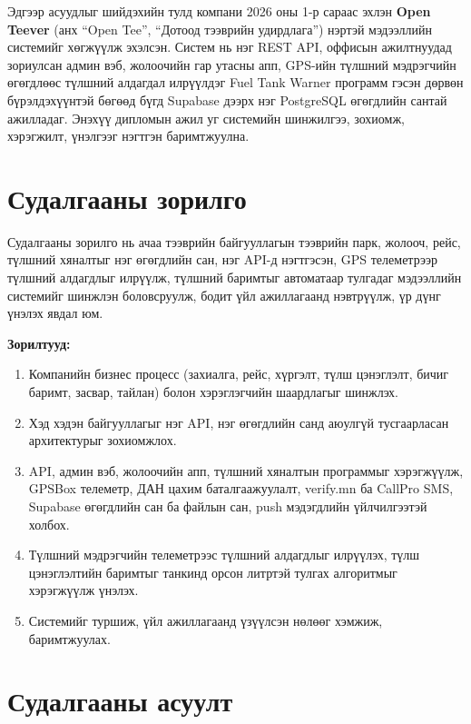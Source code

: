 \documentclass[
12pt,
oneside,
english,
onehalfspacing,
nolistspacing,
headsepline,
]{MUST-Thesis}
\begin{document}
Эдгээр асуудлыг шийдэхийн тулд компани 2026 оны 1-р сараас эхлэн \textbf{Open Teever} (анх ``Open Tee'', ``Дотоод тээврийн удирдлага'') нэртэй мэдээллийн системийг хөгжүүлж эхэлсэн. Систем нь нэг REST API, оффисын ажилтнуудад зориулсан админ вэб, жолоочийн гар утасны апп, GPS-ийн түлшний мэдрэгчийн өгөгдлөөс түлшний алдагдал илрүүлдэг Fuel Tank Warner программ гэсэн дөрвөн бүрэлдэхүүнтэй бөгөөд бүгд Supabase дээрх нэг PostgreSQL өгөгдлийн сантай ажилладаг. Энэхүү дипломын ажил уг системийн шинжилгээ, зохиомж, хэрэгжилт, үнэлгээг нэгтгэн баримтжуулна.

\section{Судалгааны зорилго}

Судалгааны зорилго нь ачаа тээврийн байгууллагын тээврийн парк, жолооч, рейс, түлшний хяналтыг нэг өгөгдлийн сан, нэг API-д нэгтгэсэн, GPS телеметрээр түлшний алдагдлыг илрүүлж, түлшний баримтыг автоматаар тулгадаг мэдээллийн системийг шинжлэн боловсруулж, бодит үйл ажиллагаанд нэвтрүүлж, үр дүнг үнэлэх явдал юм.

\textbf{Зорилтууд:}
\begin{enumerate}
    \item Компанийн бизнес процесс (захиалга, рейс, хүргэлт, түлш цэнэглэлт, бичиг баримт, засвар, тайлан) болон хэрэглэгчийн шаардлагыг шинжлэх.
    \item Хэд хэдэн байгууллагыг нэг API, нэг өгөгдлийн санд аюулгүй тусгаарласан архитектурыг зохиомжлох.
    \item API, админ вэб, жолоочийн апп, түлшний хяналтын программыг хэрэгжүүлж, GPSBox телеметр, ДАН цахим баталгаажуулалт, verify.mn ба CallPro SMS, Supabase өгөгдлийн сан ба файлын сан, push мэдэгдлийн үйлчилгээтэй холбох.
    \item Түлшний мэдрэгчийн телеметрээс түлшний алдагдлыг илрүүлэх, түлш цэнэглэлтийн баримтыг танкинд орсон литртэй тулгах алгоритмыг хэрэгжүүлж үнэлэх.
    \item Системийг туршиж, үйл ажиллагаанд үзүүлсэн нөлөөг хэмжиж, баримтжуулах.
\end{enumerate}

\section{Судалгааны асуулт}
\end{document}
